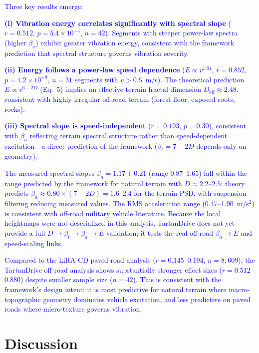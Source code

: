 \documentclass[11pt]{article}
\begin{document}
\textcolor{blue}{Three key results emerge:}

\textcolor{blue}{\textbf{(i) Vibration energy correlates significantly with spectral slope} ($r = 0.512$, $p = 5.4 \times 10^{-4}$, $n = 42$). Segments with steeper power-law spectra (higher $\beta_a$) exhibit greater vibration energy, consistent with the framework prediction that spectral structure governs vibration severity.}

\textcolor{blue}{\textbf{(ii) Energy follows a power-law speed dependence} ($E \propto v^{1.04}$, $r = 0.852$, $p = 1.2 \times 10^{-9}$, $n = 31$ segments with $v > 0.5$~m/s). The theoretical prediction $E \propto v^{6-2D}$ (Eq.~5) implies an effective terrain fractal dimension $D_{\mathrm{eff}} \approx 2.48$, consistent with highly irregular off-road terrain (forest floor, exposed roots, rocks).}

\textcolor{blue}{\textbf{(iii) Spectral slope is speed-independent} ($r = 0.193$, $p = 0.30$), consistent with $\beta_a$ reflecting terrain spectral structure rather than speed-dependent excitation---a direct prediction of the framework ($\beta_t = 7-2D$ depends only on geometry).}

\textcolor{blue}{The measured spectral slopes $\beta_a = 1.17 \pm 0.21$ (range 0.87--1.65) fall within the range predicted by the framework for natural terrain with $D \approx 2.2$--$2.5$: theory predicts $\beta_a \approx 0.80 \times (7-2D) = 1.6$--$2.4$ for the terrain PSD, with suspension filtering reducing measured values. The RMS acceleration range (0.47--1.90~m/s$^2$) is consistent with off-road military vehicle literature\cite{Wong2022}. Because the local heightmaps were not deserialized in this analysis, TartanDrive does not yet provide a full $D \rightarrow \beta_t \rightarrow \beta_a \rightarrow E$ validation; it tests the real off-road $\beta_a \rightarrow E$ and speed-scaling links.}

\textcolor{blue}{Compared to the LiRA-CD paved-road analysis ($r = 0.145$--$0.194$, $n = 8{,}609$), the TartanDrive off-road analysis shows substantially stronger effect sizes ($r = 0.512$--$0.880$) despite smaller sample size ($n = 42$). This is consistent with the framework's design intent: it is most predictive for natural terrain where macro-topographic geometry dominates vehicle excitation, and less predictive on paved roads where micro-texture governs vibration.}

\section*{Discussion}
\end{document}
